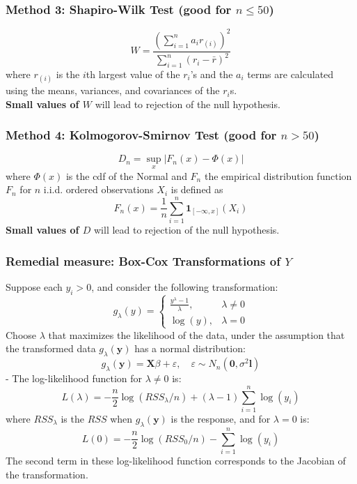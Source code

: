 \documentclass[11pt,a4paper]{article}
\begin{document}
\subsubsection{Method 3: Shapiro-Wilk Test (good for $n \leq 50$)}
$$W=\frac{(\sum_{i=1}^n a_i r_{(i)})^2}{\sum_{i=1}^n(r_i-\bar{r})^2}$$
where $r_{(i)}$ is the $i$th largest value of the $r_i$’s and the $a_i$ terms are calculated using the means, variances, and covariances of the $r_i$s.\\
\textbf{Small values of $W$} will lead to rejection of the null hypothesis.

\subsubsection{Method 4: Kolmogorov-Smirnov Test (good for $n > 50$)}
$$D_n=\sup_x |F_n(x)-\Phi(x)|$$
where $\Phi(x)$ is the cdf of the Normal and $F_n$ the empirical distribution function $F_n$ for $n$ i.i.d. ordered observations $X_i$ is deﬁned as
$$F_n(x)=\frac{1}{n}\sum_{i=1}^n \mathbf{1}_{[-\infty,x]}(X_i)$$
\textbf{Small values of $D$} will lead to rejection of the null hypothesis.

\subsubsection{Remedial measure: Box-Cox Transformations of $Y$}

Suppose each $y_i>0$, and consider the following transformation:
$$g_\lambda(y)=\left\{\begin{matrix}
    \frac{y^\lambda-1}{\lambda},&\lambda\neq0\\
    \log(y),& \lambda=0
\end{matrix}\right.$$
Choose $\lambda$ that maximizes the likelihood of the data, under the assumption that the transformed data $g_{\lambda}(\mathbf{y})$ has a normal distribution:
$$
g_{\lambda}(\mathbf{y})=\mathbf{X} \beta+\varepsilon, \quad \varepsilon \sim N_{n}\left(\mathbf{0}, \sigma^{2} \mathbf{l}\right)
$$
- The log-likelihood function for $\lambda \neq 0$ is:
$$
L(\lambda)=-\frac{n}{2} \log \left(R S S_{\lambda} / n\right)+(\lambda-1) \sum_{i=1}^{n} \log \left(y_{i}\right)
$$
where $R S S_{\lambda}$ is the $R S S$ when $g_{\lambda}(\mathbf{y})$ is the response, and for $\lambda=0$ is:
$$
L(0)=-\frac{n}{2} \log \left(R S S_{0} / n\right)-\sum_{i=1}^{n} \log \left(y_{i}\right)
$$
The second term in these log-likelihood function corresponds to the Jacobian of the transformation.\\
\end{document}
